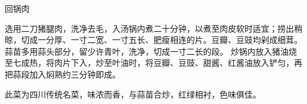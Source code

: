 \begin{recipe}{回锅肉}

\begin{ingredients}
\end{ingredients}

\begin{cooking}
\step 选用二刀猪腿肉，洗净去毛，入汤锅内煮二十分钟，以煮至肉皮软时适宜；捞出稍晾，切成一分厚、一寸二宽、一寸五长、肥瘦相连的片。豆瓣、豆豉均剁成细茸。蒜苗多用蒜头部分，留少许青叶，洗净，切成一寸二长的段。
\step 炒锅内放入猪油烧至七成热，将肉片下入，炒至叶油时，将豆瓣、豆豉、甜酱、红酱油放入铲匀，再把蒜段加入焖熟约三分钟即成。
\end{cooking}

\begin{note}
此菜为四川传统名菜，味浓而香，与蒜苗合炒，红绿相衬，色味俱佳。
\end{note}

\end{recipe}

